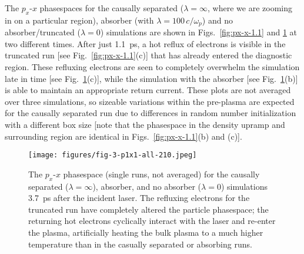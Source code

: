 \documentclass[../absorber.tex]{subfiles}
\begin{document}
The $p_x$-$x$ phasespaces for the causally separated ($\lambda=\infty$, where we are zooming in on a particular region), absorber (with $\lambda=100\,c/\omega_p$) and no absorber/truncated ($\lambda=0$) simulations are shown in Figs.~\ref{fig:px-x-1.1} and \ref{fig:px-x-3.7} at two different times.  After just 1.1~ps, a hot reflux of electrons is visible in the truncated run [see Fig.~\ref{fig:px-x-1.1}(c)] that has already entered the diagnostic region.  These refluxing electrons are seen to completely overwhelm the simulation late in time [see Fig.~\ref{fig:px-x-3.7}(c)], while the simulation with the absorber [see Fig.~\ref{fig:px-x-3.7}(b)] is able to maintain an appropriate return current.  These plots are not averaged over three simulations, so sizeable variations within the pre-plasma are expected for the causally separated run due to differences in random number initialization with a different box size [note that the phasespace in the density upramp and surrounding region are identical in Figs.~\ref{fig:px-x-1.1}(b) and (c)].

\begin{figure}
\texttt{[image: figures/fig-3-p1x1-all-210.jpeg]}
\caption{\label{fig:px-x-3.7} The $p_x$-$x$ phasespace (single runs, not averaged) for the causally separated ($\lambda=\infty$), absorber, and no absorber ($\lambda=0$) simulations 3.7~ps after the incident laser.  The refluxing electrons for the truncated run have completely altered the particle phasespace; the returning hot electrons cyclically interact with the laser and re-enter the plasma, artificially heating the bulk plasma to a much higher temperature than in the casually separated or absorbing runs.}
\end{figure}

\end{document}

